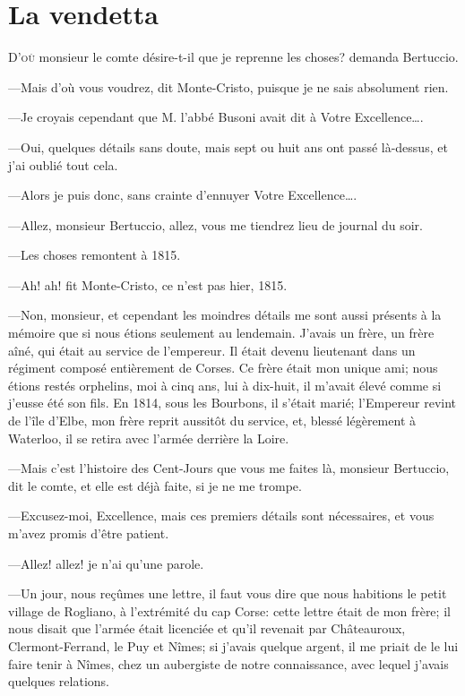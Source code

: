 \chapter{La vendetta} 

\lettrine[ante=«]{D}{'où} monsieur le comte désire-t-il que je reprenne les choses? demanda Bertuccio. 

\zz
—Mais d'où vous voudrez, dit Monte-Cristo, puisque je ne sais absolument rien. 

—Je croyais cependant que M. l'abbé Busoni avait dit à Votre Excellence\dots. 

—Oui, quelques détails sans doute, mais sept ou huit ans ont passé là-dessus, et j'ai oublié tout cela. 

—Alors je puis donc, sans crainte d'ennuyer Votre Excellence\dots. 

—Allez, monsieur Bertuccio, allez, vous me tiendrez lieu de journal du soir. 

—Les choses remontent à 1815. 

—Ah! ah! fit Monte-Cristo, ce n'est pas hier, 1815. 

—Non, monsieur, et cependant les moindres détails me sont aussi présents à la mémoire que si nous étions seulement au lendemain. J'avais un frère, un frère aîné, qui était au service de l'empereur. Il était devenu lieutenant dans un régiment composé entièrement de Corses. Ce frère était mon unique ami; nous étions restés orphelins, moi à cinq ans, lui à dix-huit, il m'avait élevé comme si j'eusse été son fils. En 1814, sous les Bourbons, il s'était marié; l'Empereur revint de l'île d'Elbe, mon frère reprit aussitôt du service, et, blessé légèrement à Waterloo, il se retira avec l'armée derrière la Loire. 

—Mais c'est l'histoire des Cent-Jours que vous me faites là, monsieur Bertuccio, dit le comte, et elle est déjà faite, si je ne me trompe. 

—Excusez-moi, Excellence, mais ces premiers détails sont nécessaires, et vous m'avez promis d'être patient. 

—Allez! allez! je n'ai qu'une parole. 

—Un jour, nous reçûmes une lettre, il faut vous dire que nous habitions le petit village de Rogliano, à l'extrémité du cap Corse: cette lettre était de mon frère; il nous disait que l'armée était licenciée et qu'il revenait par Châteauroux, Clermont-Ferrand, le Puy et Nîmes; si j'avais quelque argent, il me priait de le lui faire tenir à Nîmes, chez un aubergiste de notre connaissance, avec lequel j'avais quelques relations. 

